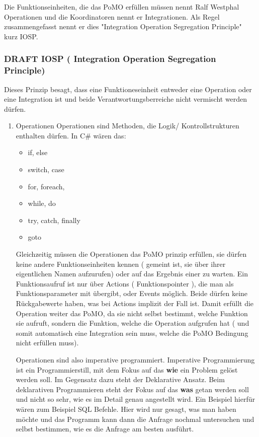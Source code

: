 \documentclass[11pt]{article}
\begin{document}
Die Funktionseinheiten, die das PoMO erfüllen müssen nennt Ralf Westphal Operationen und die Koordinatoren nennt er
Integrationen. Als Regel zusammengefasst nennt er dies "Integration Operation Segregation Principle" kurz IOSP.


\subsubsection{{\bfseries\sffamily DRAFT} IOSP ( Integration Operation Segregation Principle)}
\label{sec:orgheadline38}

Dieses Prinzip besagt, dass eine Funktioneseinheit entweder eine Operation oder eine Integration ist und beide
Verantwortungsberreiche nicht vermischt werden dürfen.

\begin{enumerate}
\item Operationen
\label{sec:orgheadline36}
Operationen sind Methoden, die Logik/ Kontrollstrukturen enthalten dürfen. In C\# wären das:
\begin{itemize}
\item if, else
\item switch, case
\item for, foreach,
\item while, do
\item try, catch, finally
\item goto
\end{itemize}




Gleichzeitig müssen die Operationen das PoMO prinzip erfüllen, sie dürfen keine
andere Funktionseinheiten kennen ( gemeint ist, sie über ihrer eigentlichen
Namen aufzurufen) oder auf das Ergebnis einer zu warten. 
Ein Funktionsaufruf ist nur über Actions ( Funktionspointer ), die man als Funktionsparameter mit übergibt, oder Events möglich.
Beide dürfen keine Rückgabewerte haben, was bei Actions implizit der Fall ist.
Damit erfüllt die Operation weiter das PoMO, da sie nicht selbst bestimmt, welche Funktion sie aufruft, sondern die Funktion,
welche die Operation aufgrufen hat ( und somit automatisch eine Integration sein muss, welche die PoMO Bedingung nicht erfüllen muss).


Operationen sind also imperative programmiert. Imperative Programmierung ist ein Programmierstill,
mit dem Fokus auf das \textbf{wie} ein Problem gelöst werden soll.
Im Gegensatz dazu steht der Deklarative Ansatz.
Beim deklarativen Programmieren steht der Fokus auf das \textbf{was} getan werden soll und nicht so sehr,
wie es im Detail genau angestellt wird. Ein Beispiel hierfür wären zum Beispiel SQL Befehle.
Hier wird nur gesagt, was man haben möchte und das Programm kann dann die Anfrage nochmal untersuchen
und selbst bestimmen, wie es die Anfrage am besten ausführt.


\end{enumerate}
\end{document}
